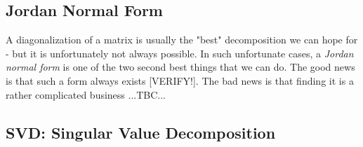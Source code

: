 


\subsection{Jordan Normal Form}
A diagonalization of a matrix is usually the "best" decomposition we can hope for - but it is unfortunately not always possible. In such unfortunate cases, a \emph{Jordan normal form} is one of the two second best things that we can do. The good news is that such a form always exists [VERIFY!]. The bad news is that finding it is a rather complicated business ...TBC...












\subsection{SVD: Singular Value Decomposition}

